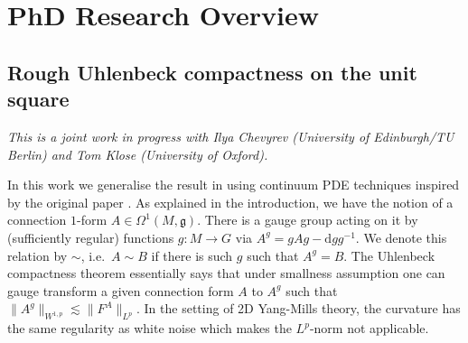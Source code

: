 \documentclass[11pt]{article}
\numberwithin{equation}{section}
\theoremstyle{definition}
\theoremstyle{remark}
\newcommand{\diff}{\mathrm{d}}
\newcommand{\1}{\mathbf 1}
\newcommand{\<}{\langle}
\renewcommand{\>}{\rangle}
\begin{document}

\section{PhD Research Overview}


\subsection{Rough Uhlenbeck compactness on the unit square}\label{sec:RUC_square}
\textit{This is a joint work in progress with Ilya Chevyrev (University of Edinburgh/TU Berlin) and Tom Klose (University of Oxford).}

\medskip

\noindent In this work we generalise the result in \cite{Chevyrev19} using continuum PDE techniques inspired by the original paper \cite{Uhlenbeck82}. As explained in the introduction, we have the notion of a connection $1$-form $A\in\Omega^1(M,\mathfrak g)$. There is a gauge group acting on it by (sufficiently regular) functions $g:M\to G$ via $A^g=gAg-\diff gg^{-1}$. We denote this relation by $\sim$, i.e.\ $A\sim B$ if there is such $g$ such that $A^g=B$.  The Uhlenbeck compactness theorem essentially says that under smallness assumption one can gauge transform a given connection form $A$ to $A^g$ such that 
$
\|A^g\|_{W^{1,p}}\lesssim \|F^A\|_{L^p}.
$
In the setting of 2D Yang-Mills theory, the curvature has the same regularity as white noise which makes the $L^p$-norm not applicable. %
\end{document}
